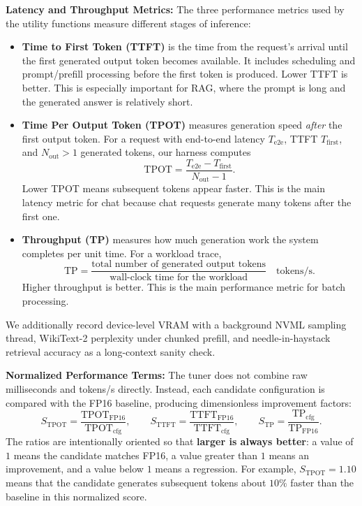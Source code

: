 \documentclass[10pt]{article}
\begin{document}
\textbf{Latency and Throughput Metrics:}
The three performance metrics used by the utility functions measure different stages of inference:
\begin{itemize}\itemsep=2pt
\item \textbf{Time to First Token (TTFT)} is the time from the request's arrival until the first generated output token becomes available. It includes scheduling and prompt/prefill processing before the first token is produced. Lower TTFT is better. This is especially important for RAG, where the prompt is long and the generated answer is relatively short.
\item \textbf{Time Per Output Token (TPOT)} measures generation speed \emph{after} the first output token. For a request with end-to-end latency $T_{\mathrm{e2e}}$, TTFT $T_{\mathrm{first}}$, and $N_{\mathrm{out}}>1$ generated tokens, our harness computes
\[
\mathrm{TPOT}
=
\frac{T_{\mathrm{e2e}}-T_{\mathrm{first}}}
     {N_{\mathrm{out}}-1}.
\]
Lower TPOT means subsequent tokens appear faster. This is the main latency metric for chat because chat requests generate many tokens after the first one.
\item \textbf{Throughput (TP)} measures how much generation work the system completes per unit time. For a workload trace,
\[
\mathrm{TP}
=
\frac{\text{total number of generated output tokens}}
     {\text{wall-clock time for the workload}}
\quad\text{tokens/s}.
\]
Higher throughput is better. This is the main performance metric for batch processing.
\end{itemize}
We additionally record device-level VRAM with a background NVML sampling thread, WikiText-2 perplexity under chunked prefill, and needle-in-haystack retrieval accuracy as a long-context sanity check.

\textbf{Normalized Performance Terms:}
The tuner does not combine raw milliseconds and tokens/s directly. Instead, each candidate configuration is compared with the FP16 baseline, producing dimensionless improvement factors:
\[
S_{\mathrm{TPOT}}
=
\frac{\mathrm{TPOT}_{\mathrm{FP16}}}
     {\mathrm{TPOT}_{\mathrm{cfg}}},
\qquad
S_{\mathrm{TTFT}}
=
\frac{\mathrm{TTFT}_{\mathrm{FP16}}}
     {\mathrm{TTFT}_{\mathrm{cfg}}},
\qquad
S_{\mathrm{TP}}
=
\frac{\mathrm{TP}_{\mathrm{cfg}}}
     {\mathrm{TP}_{\mathrm{FP16}}}.
\]
The ratios are intentionally oriented so that \textbf{larger is always better}: a value of $1$ means the candidate matches FP16, a value greater than $1$ means an improvement, and a value below $1$ means a regression. For example, $S_{\mathrm{TPOT}}=1.10$ means that the candidate generates subsequent tokens about $10\%$ faster than the baseline in this normalized score.
\end{document}
